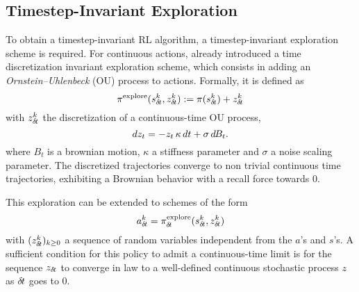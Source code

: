 
\subsection{Timestep-Invariant Exploration}
\label{subsec:explo}

To obtain a timestep-invariant RL algorithm, a timestep-invariant
exploration scheme is required. 
For continuous actions, \cite{ddpg} already introduced a time discretization invariant exploration scheme, which consists in adding an
\emph{Ornstein--Uhlenbeck} \cite{orn-uhl} (OU) process to actions. Formally, it is defined as
\begin{equation}
	\pi^\text{explore}(s^k_{\delta\hspace{-.1em}t}, z^k_{\delta\hspace{-.1em}t}) \mathrel{\mathop{:}}= \pi(s^k_{\delta\hspace{-.1em}t}) + z^k_{\delta\hspace{-.1em}t}
\end{equation}
with $z^k_{\delta\hspace{-.1em}t}$ the discretization of a continuous-time OU process,
\begin{equation}
	dz_t = - z_t \,\kappa\, dt + \sigma \,d\hspace{-.1em}B_t.
	\label{eq:orn_uhl}
\end{equation}
where $B_t$ is a brownian motion, $\kappa$ a stiffness parameter and
$\sigma$ a noise scaling parameter. The discretized trajectories converge
to non trivial continuous time trajectories, exhibiting a Brownian
behavior with a recall force towards $0$.

This exploration can be extended to schemes of the form
\begin{equation}
  \label{eq:explore}
	a^k_{\delta\hspace{-.1em}t} = \pi^\text{explore}_{\delta\hspace{-.1em}t}(s^k_{\delta\hspace{-.1em}t}, z^k_{\delta\hspace{-.1em}t})
\end{equation}
with $(z^k_{\delta\hspace{-.1em}t})_{k\geq 0}$ a sequence of random variables independent from the $a$'s and $s$'s.
A sufficient condition for this policy to admit a continuous-time
limit is for the sequence
$z_{\delta\hspace{-.1em}t}$ to converge in law to a
well-defined continuous stochastic process $z$ as ${\delta\hspace{-.1em}t}$ goes to $0$.

